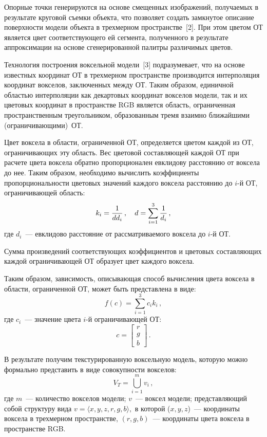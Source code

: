\begin{multicols}{2}
{}

  Опорные точки генерируются на основе смещенных изображений,
получаемых в результате круговой съемки объекта, что позволяет создать
замкнутое описание поверхности модели объекта в трехмерном
пространстве~[2]. При этом цветом ОТ является цвет соответствующего ей
сегмента, полученного в результате аппроксимации на основе
сгенерированной палитры различимых цветов.

  Технология построения воксельной модели~[3] подразумевает, что на
основе известных координат ОТ в трехмерном пространстве производится
интерполяция координат вокселов, заключенных между ОТ. Таким образом,
единичной областью интерполяции как декартовых координат вокселов
модели, так и их цветовых координат в пространстве RGB является область,
ограниченная пространственным треугольником, образованным тремя
взаимно ближайшими (ограничива\-ющи\-ми)~ОТ.

  Цвет воксела в области, ограниченной ОТ, определяется цветом каждой из
ОТ, ограничивающих эту область. Вес цветовой составляющей каждой ОТ
при расчете цвета воксела обратно пропорционален евклидову расстоянию от
воксела до нее. Таким образом, необходимо вычислить коэффициенты
пропорциональности цветовых значений каждого воксела расстоянию до
  $i$-й ОТ, ограничивающей область:
  $$ k_i=\displaystyle\frac{\displaystyle 1\mathstrut}{\displaystyle dd_i\mathstrut}\,,\quad d=\sum\limits_{i=1}^3 \displaystyle\frac{\displaystyle 1\mathstrut}{\displaystyle d_i\mathstrut}\,,
  $$
где $d_i$~--- евклидово расстояние от рассматриваемого воксела до $i$-й ОТ.

  Сумма произведений соответствующих коэффициентов и цветовых
составляющих каждой ограничивающей ОТ образует цвет каждого воксела.

  Таким образом, зависимость, описывающая способ вычисления цвета
воксела в области, ограниченной ОТ, может быть представлена в виде:
  $$
  f(c)=\sum\limits_{i=1}^3 c_i k_i\,,
  $$
где $c_i$~--- значение цвета $i$-й ограничивающей ОТ:
$$
c=\begin{bmatrix}
r\\[-2pt]
g\\
b
\end{bmatrix}\,.
$$

  В результате получим текстурированную воксельную модель, которую
можно формально представить в виде совокупности вокселов:
  $$
  V_T= \mathop{\bigcup}\limits_{i=1}^m v_i\,,
  $$
где $m$~--- количество вокселов модели;
$v$~--- воксел модели; представляющий собой структуру вида
$v = \langle x,y,z,r,g,b\rangle,$
в которой ($x, y, z$)~--- координаты воксела в трехмерном пространстве,
$(r, g, b)$~--- координаты цвета воксела в пространстве RGB.


\end{multicols}
